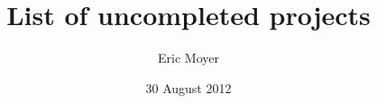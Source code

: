 \documentclass[english]{article}
\begin{document}
\title{List of uncompleted projects}


\author{Eric Moyer}


\date{30 August 2012}

\maketitle
\end{document}
